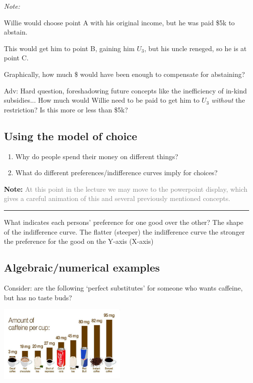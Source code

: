 \documentclass[]{article}
\providecommand{\tightlist}{%
  \setlength{\itemsep}{0pt}\setlength{\parskip}{0pt}}
\begin{document}
\emph{Note:}

Willie would choose point A with his original income, but he was paid \$5k to abstain.

This would get him to point B, gaining him \(U_3\), but his uncle reneged, so he is at point C.

Graphically, how much \$ would have been enough to compensate for abstaining?

\textcolor{RawSienna}{Adv: Hard question, foreshadowing future concepts like the inefficiency of in-kind subsidies... How much would Willie need to be paid to get him to $U_3$ \emph{without} the restriction?  Is this more or less than \$5k?}

\hypertarget{using-the-model-of-choice}{%
\subsection{Using the model of choice}\label{using-the-model-of-choice}}

\begin{enumerate}
\def\labelenumi{\arabic{enumi}.}
\tightlist
\item
  Why do people spend their money on different things?
\item
  What do different preferences/indifference curves imply for choices?
\end{enumerate}

\textbf{Note:} \textcolor{gray}{At this point in the lecture we may move to the powerpoint display, which gives a careful animation of this and several previously mentioned concepts.}

\begin{center}\rule{0.5\linewidth}{\linethickness}\end{center}

What indicates each persons' preference for one good over the other?
The shape of the indifference curve. The flatter (steeper) the indifference curve the stronger the preference for the good on the Y-axis (X-axis)

\hypertarget{algebraicnumerical-examples}{%
\subsection{Algebraic/numerical examples}\label{algebraicnumerical-examples}}

Consider: are the following `perfect substitutes' for someone who wants caffeine, but has no taste buds?

\includegraphics[height=1.5in]{picsfigs/amount-of-caffeine-in-drinks.jpg}
\end{document}
